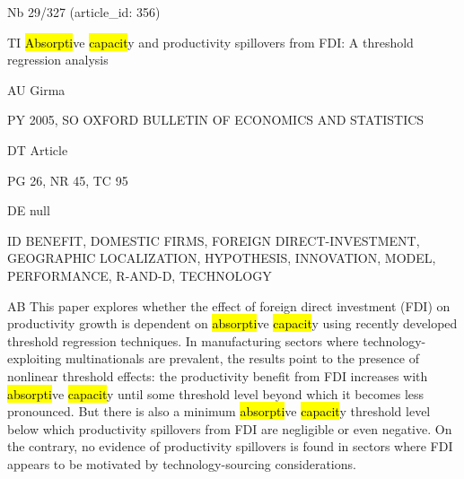 \documentclass[a4paper]{article}
\begin{document}
\vspace*{-2cm}
Nb \tabto{0cm}29/327 (article\_id: 356)\par
TI \tabto{0cm}\hl{Absorpti}ve \hl{capacit}y and productivity spillovers from FDI: A threshold regression analysis\par
AU \tabto{0cm}Girma\par
PY \tabto{0cm}2005, SO OXFORD BULLETIN OF ECONOMICS AND STATISTICS\par
DT \tabto{0cm}Article\par
PG \tabto{0cm}26, NR 45, TC 95\par
DE \tabto{0cm}null\par
ID \tabto{0cm}BENEFIT, DOMESTIC FIRMS, FOREIGN DIRECT-INVESTMENT, GEOGRAPHIC LOCALIZATION, HYPOTHESIS, INNOVATION, MODEL, PERFORMANCE, R-AND-D, TECHNOLOGY\par
AB \tabto{0cm}This paper explores whether the effect of foreign direct investment (FDI) on productivity growth is dependent on \hl{absorpti}ve \hl{capacit}y using recently developed threshold regression techniques. In manufacturing sectors where technology-exploiting multinationals are prevalent, the results point to the presence of nonlinear threshold effects: the productivity benefit from FDI increases with \hl{absorpti}ve \hl{capacit}y until some threshold level beyond which it becomes less pronounced. But there is also a minimum \hl{absorpti}ve \hl{capacit}y threshold level below which productivity spillovers from FDI are negligible or even negative. On the contrary, no evidence of productivity spillovers is found in sectors where FDI appears to be motivated by technology-sourcing considerations.\par
\clearpage
\end{document}
